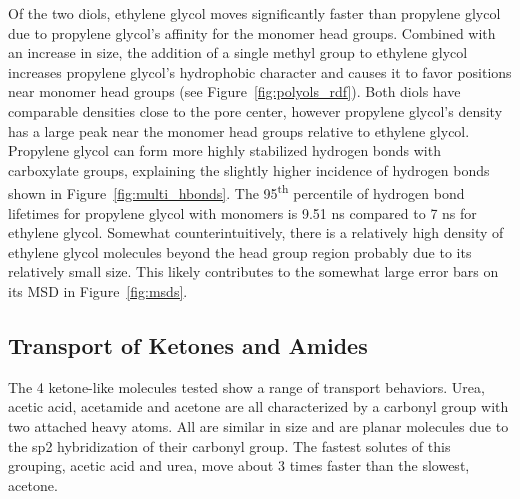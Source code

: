 \documentclass[journal=jpcbfk,manuscript=article]{achemso}
\begin{document}
  Of the two diols, ethylene glycol moves significantly faster than propylene
  glycol due to propylene glycol's affinity for the monomer head groups.
  Combined with an increase in size, the addition of a single methyl group to
  ethylene glycol increases propylene glycol's hydrophobic character and causes
  it to favor positions near monomer head groups (see Figure~\ref{fig:polyols_rdf}).
  Both diols have comparable densities close to the pore center, however propylene
  glycol's density has a large peak near the monomer head groups relative to 
  ethylene glycol. Propylene glycol can form more highly stabilized hydrogen 
  bonds with carboxylate groups, explaining the slightly higher incidence of 
  hydrogen bonds shown in Figure~\ref{fig:multi_hbonds}. The 95\textsuperscript{th}
  percentile of hydrogen bond lifetimes for propylene glycol with monomers is 9.51 ns
  compared to 7 ns for ethylene glycol. 
  Somewhat counterintuitively, there is a 
  relatively high density of ethylene glycol molecules beyond the head group region
  probably due to its relatively small size. This likely contributes to the somewhat
  large error bars on its MSD in Figure~\ref{fig:msds}. 

  \subsection{Transport of Ketones and Amides}
  
  The 4 ketone-like molecules tested show a range of transport behaviors. 
  Urea, acetic acid, acetamide and acetone are all characterized by
  a carbonyl group with two attached heavy atoms. All are similar in size and
  are planar molecules due to the sp2 hybridization of their carbonyl group. 
  The fastest solutes of this grouping, acetic acid and urea, move about 3
  times faster than the slowest, acetone.
  
\end{document}
